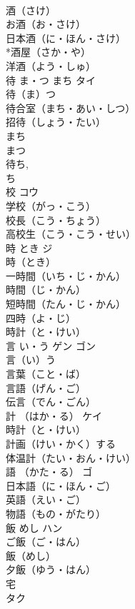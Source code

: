 \documentclass[8pt]{extreport}
\begin{document}
\begin{CJK}{UTF8}{min}
\\	酒（さけ）　
\\	お酒（お・さけ）　
\\	日本酒（に・ほん・さけ）　
\\	*酒屋（さか・や）　
\\	洋酒（よう・しゅ）　
\\	待	ま・つ まち	タイ	
\\	待（ま）つ　
\\	待合室（まち・あい・しつ）　
\\	招待（しょう・たい）　
\\	まち 
\\	まつ 
\\	待ち, 
\\	ち 
\\	校		コウ	
\\	学校（がっ・こう）　
\\	校長（こう・ちょう）　
\\	高校生（こう・こう・せい）　
\\	時	とき	ジ	
\\	時（とき）　
\\	一時間（いち・じ・かん）　
\\	時間（じ・かん）　
\\	短時間（たん・じ・かん）　
\\	四時（よ・じ）　
\\	時計（と・けい）　
\\	言	い・う	ゲン ゴン	
\\	言（い）う　
\\	言葉（こと・ば）　
\\	言語（げん・ご）　
\\	伝言（でん・ごん）　
\\	計	（はか・る）	ケイ	
\\	時計（と・けい）　
\\	計画（けい・かく）する　
\\	体温計（たい・おん・けい）　
\\	語	（かた・る）	ゴ	
\\	日本語（に・ほん・ご）　
\\	英語（えい・ご）　
\\	物語（もの・がたり）　
\\	飯	めし	ハン	
\\	ご飯（ご・はん）　
\\	飯（めし）　
\\	夕飯（ゆう・はん）　
\\	宅	
\\	タク	

\end{CJK}
\end{document}

